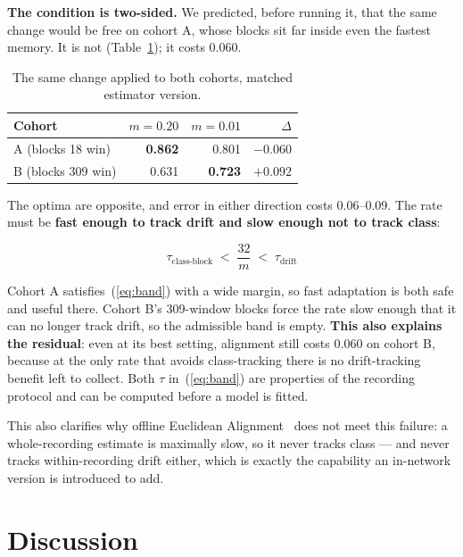 \documentclass[conference]{IEEEtran}
\begin{document}
\textbf{The condition is two-sided.} We predicted, before running it, that the
same change would be free on cohort A, whose blocks sit far inside even the
fastest memory. It is not
(Table~\ref{tab:twosided}); it costs 0.060.

\begin{table}[htbp]
\caption{The same change applied to both cohorts, matched estimator version.}
\label{tab:twosided}
\centering
\begin{tabular}{lrrr}
\toprule
Cohort & $m=0.20$ & $m=0.01$ & $\Delta$ \\
\midrule
A (blocks 18 win)  & \textbf{0.862} & 0.801 & $\mathbf{-0.060}$ \\
B (blocks 309 win) & 0.631 & \textbf{0.723} & $\mathbf{+0.092}$ \\
\bottomrule
\end{tabular}
\end{table}

The optima are opposite, and error in either direction costs 0.06--0.09. The
rate must be \textbf{fast enough to track drift and slow enough not to track
class}:

\begin{equation}
\tau_{\mathrm{class\text{-}block}} \;<\; \frac{32}{m} \;<\; \tau_{\mathrm{drift}}
\label{eq:band}
\end{equation}

Cohort A satisfies~(\ref{eq:band}) with a wide margin, so fast adaptation is both
safe and useful there. Cohort B's 309-window blocks force the rate slow enough
that it can no longer track drift, so the admissible band is empty. \textbf{This
also explains the residual}: even at its best setting, alignment still costs
0.060 on cohort B, because at the only rate that avoids class-tracking there is
no drift-tracking benefit left to collect. Both $\tau$ in~(\ref{eq:band}) are
properties of the recording protocol and can be computed before a model is
fitted.

This also clarifies why offline Euclidean Alignment~\cite{hewu} does not meet
this failure: a whole-recording estimate is maximally slow, so it never tracks
class --- and never tracks within-recording drift either, which is exactly the
capability an in-network version is introduced to add.

\section{Discussion}
\end{document}
